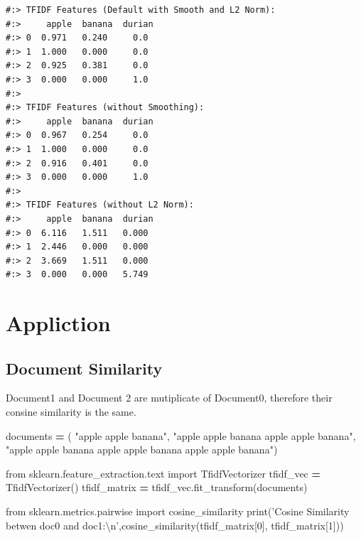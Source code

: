 \documentclass[
]{book}
\newenvironment{Shaded}{\begin{snugshade}}{\end{snugshade}}
\newcommand{\BuiltInTok}[1]{#1}
\newcommand{\CharTok}[1]{\textcolor[rgb]{0.5,0.5,0.5}{#1}}
\newcommand{\DecValTok}[1]{\textcolor[rgb]{0.06,0.06,0.06}{#1}}
\newcommand{\ImportTok}[1]{#1}
\newcommand{\NormalTok}[1]{#1}
\newcommand{\OperatorTok}[1]{\textcolor[rgb]{0.43,0.43,0.43}{\textbf{#1}}}
\newcommand{\StringTok}[1]{\textcolor[rgb]{0.5,0.5,0.5}{#1}}
\begin{document}
\begin{verbatim}
#:> TFIDF Features (Default with Smooth and L2 Norm):
#:>     apple  banana  durian
#:> 0  0.971   0.240     0.0
#:> 1  1.000   0.000     0.0
#:> 2  0.925   0.381     0.0
#:> 3  0.000   0.000     1.0 
#:> 
#:> TFIDF Features (without Smoothing):
#:>     apple  banana  durian
#:> 0  0.967   0.254     0.0
#:> 1  1.000   0.000     0.0
#:> 2  0.916   0.401     0.0
#:> 3  0.000   0.000     1.0 
#:> 
#:> TFIDF Features (without L2 Norm):
#:>     apple  banana  durian
#:> 0  6.116   1.511   0.000
#:> 1  2.446   0.000   0.000
#:> 2  3.669   1.511   0.000
#:> 3  0.000   0.000   5.749
\end{verbatim}

\hypertarget{appliction}{%
\section{Appliction}\label{appliction}}

\hypertarget{document-similarity}{%
\subsection{Document Similarity}\label{document-similarity}}

Document1 and Document 2 are mutiplicate of Document0, therefore their consine similarity is the same.

\begin{Shaded}
\begin{Highlighting}[]
\NormalTok{documents }\OperatorTok{=}\NormalTok{ (}
    \StringTok{"apple apple banana"}\NormalTok{,}
    \StringTok{"apple apple banana apple apple banana"}\NormalTok{,}
    \StringTok{"apple apple banana apple apple banana apple apple banana"}\NormalTok{)}
    
\ImportTok{from}\NormalTok{ sklearn.feature_extraction.text }\ImportTok{import}\NormalTok{ TfidfVectorizer}
\NormalTok{tfidf_vec }\OperatorTok{=}\NormalTok{ TfidfVectorizer()}
\NormalTok{tfidf_matrix }\OperatorTok{=}\NormalTok{ tfidf_vec.fit_transform(documents)}

\ImportTok{from}\NormalTok{ sklearn.metrics.pairwise }\ImportTok{import}\NormalTok{ cosine_similarity}
\BuiltInTok{print}\NormalTok{(}\StringTok{'Cosine Similarity betwen doc0 and doc1:}\CharTok{\textbackslash{}n}\StringTok{'}\NormalTok{,cosine_similarity(tfidf_matrix[}\DecValTok{0}\NormalTok{], tfidf_matrix[}\DecValTok{1}\NormalTok{]))}
\end{Highlighting}
\end{Shaded}
\end{document}

